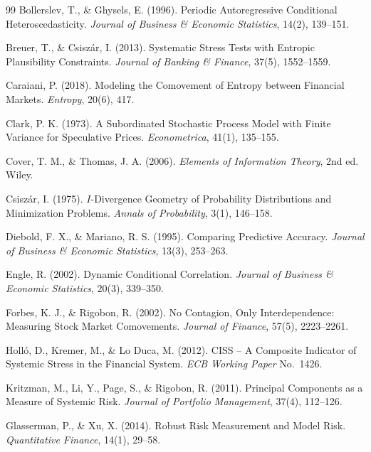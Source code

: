 \begin{thebibliography}{99}
 Bollerslev, T., \& Ghysels, E. (1996). Periodic Autoregressive Conditional Heteroscedasticity. \textit{Journal of Business \& Economic Statistics}, 14(2), 139--151.

 Breuer, T., \& Csiszár, I. (2013). Systematic Stress Tests with Entropic Plausibility Constraints. \textit{Journal of Banking \& Finance}, 37(5), 1552--1559.

 Caraiani, P. (2018). Modeling the Comovement of Entropy between Financial Markets. \textit{Entropy}, 20(6), 417.

 Clark, P. K. (1973). A Subordinated Stochastic Process Model with Finite Variance for Speculative Prices. \textit{Econometrica}, 41(1), 135--155.

 Cover, T. M., \& Thomas, J. A. (2006). \textit{Elements of Information Theory}, 2nd ed. Wiley.

 Csiszár, I. (1975). $I$-Divergence Geometry of Probability Distributions and Minimization Problems. \textit{Annals of Probability}, 3(1), 146--158.

 Diebold, F. X., \& Mariano, R. S. (1995). Comparing Predictive Accuracy. \textit{Journal of Business \& Economic Statistics}, 13(3), 253--263.

 Engle, R. (2002). Dynamic Conditional Correlation. \textit{Journal of Business \& Economic Statistics}, 20(3), 339--350.

 Forbes, K. J., \& Rigobon, R. (2002). No Contagion, Only Interdependence: Measuring Stock Market Comovements. \textit{Journal of Finance}, 57(5), 2223--2261.

 Holló, D., Kremer, M., \& Lo Duca, M. (2012). CISS -- A Composite Indicator of Systemic Stress in the Financial System. \textit{ECB Working Paper} No.~1426.

 Kritzman, M., Li, Y., Page, S., \& Rigobon, R. (2011). Principal Components as a Measure of Systemic Risk. \textit{Journal of Portfolio Management}, 37(4), 112--126.

 Glasserman, P., \& Xu, X. (2014). Robust Risk Measurement and Model Risk. \textit{Quantitative Finance}, 14(1), 29--58.


\end{thebibliography}
